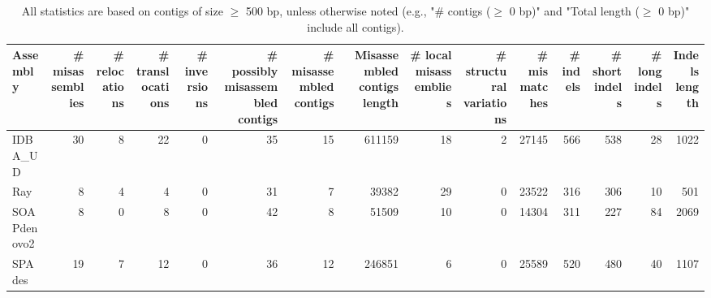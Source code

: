 \documentclass[12pt,a4paper]{article}
\begin{document}
\begin{table}[ht]
\begin{center}
\caption{All statistics are based on contigs of size $\geq$ 500 bp, unless otherwise noted (e.g., "\# contigs ($\geq$ 0 bp)" and "Total length ($\geq$ 0 bp)" include all contigs).}
\begin{tabular}{|l*{14}{|r}|}
\hline
Assembly & \# misassemblies &     \# relocations &     \# translocations &     \# inversions & \# possibly misassembled contigs & \# misassembled contigs & Misassembled contigs length & \# local misassemblies & \# structural variations & \# mismatches & \# indels &     \# short indels &     \# long indels & Indels length \\ \hline
IDBA\_UD & 30 & 8 & 22 & 0 & 35 & 15 & 611159 & 18 & 2 & 27145 & 566 & 538 & 28 & 1022 \\ \hline
Ray & 8 & 4 & 4 & 0 & 31 & 7 & 39382 & 29 & 0 & 23522 & 316 & 306 & 10 & 501 \\ \hline
SOAPdenovo2 & 8 & 0 & 8 & 0 & 42 & 8 & 51509 & 10 & 0 & 14304 & 311 & 227 & 84 & 2069 \\ \hline
SPAdes & 19 & 7 & 12 & 0 & 36 & 12 & 246851 & 6 & 0 & 25589 & 520 & 480 & 40 & 1107 \\ \hline
\end{tabular}
\end{center}
\end{table}
\end{document}
